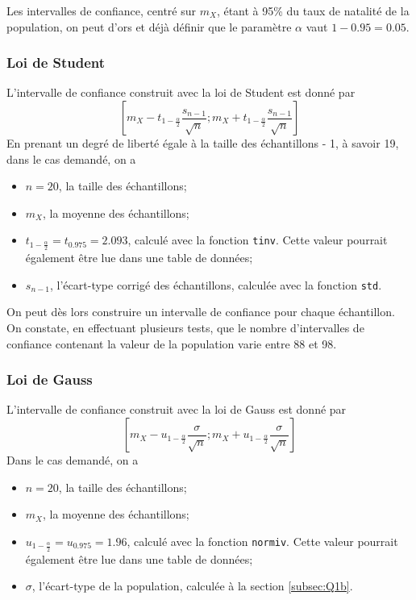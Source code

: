 \documentclass[a4paper, 12pt]{article}
\begin{document}
	Les intervalles de confiance, centré sur \(m_X\), étant à \num{95}\% du taux de natalité de la population, on peut d'ors et déjà définir que le paramètre \(\alpha\) vaut \(\num{1} - \num{0.95} = \num{0.05}\).
	
	\subsubsection{Loi de Student}
	L'intervalle de confiance construit avec la loi de Student est donné par
	\begin{displaymath}
	    \left [m_X-t_{1-\frac{\alpha}{2}}\frac{s_{n-1}}{\sqrt{n}}; m_X+t_{1-\frac{\alpha}{2}}\frac{s_{n-1}}{\sqrt{n}}\right ]
	\end{displaymath}
	En prenant un degré de liberté égale à la taille des échantillons - \num{1}, à savoir \num{19}, dans le cas demandé, on a
	
	\begin{itemize}
	    \item \(n = \num{20}\), la taille des échantillons;
	    \item \(m_X\), la moyenne des échantillons;
	    \item \(t_{1-\frac{\alpha}{2}} = t_{\num{0.975}} = \num{2.093}\), calculé avec la fonction \texttt{tinv}. Cette valeur pourrait également être lue dans une table de données;
	    \item \(s_{n-1}\), l'écart-type corrigé des échantillons, calculée avec la fonction \texttt{std}.
	\end{itemize}
	
	On peut dès lors construire un intervalle de confiance pour chaque échantillon. On constate, en effectuant plusieurs tests, que le nombre d'intervalles de confiance contenant la valeur de la population varie entre \num{88} et \num{98}.
	
	\subsubsection{Loi de Gauss}
	L'intervalle de confiance construit avec la loi de Gauss est donné par
	\begin{displaymath}
	    \left [m_X-u_{1-\frac{\alpha}{2}}\frac{\sigma}{\sqrt{n}}; m_X+u_{1-\frac{\alpha}{2}}\frac{\sigma}{\sqrt{n}}\right ]
	\end{displaymath}
	Dans le cas demandé, on a
	
	\begin{itemize}
	    \item \(n = \num{20}\), la taille des échantillons;
	    \item \(m_X\), la moyenne des échantillons;
	    \item \(u_{1-\frac{\alpha}{2}} = u_{\num{0.975}} = \num{1.96}\), calculé avec la fonction \texttt{normiv}. Cette valeur pourrait également être lue dans une table de données;
	    \item \(\sigma\), l'écart-type de la population, calculée à la section \ref{subsec:Q1b}.
	\end{itemize}
	
\end{document}

